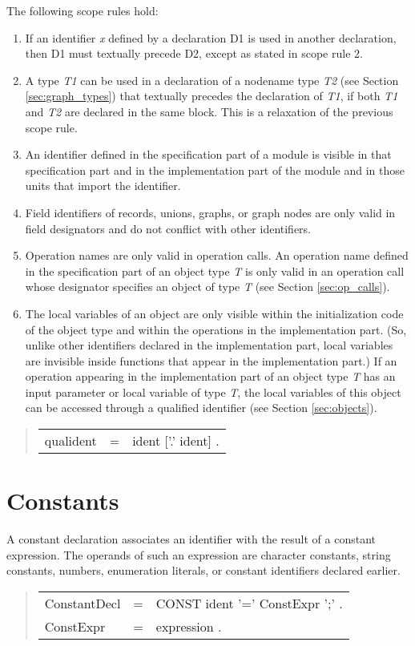 \documentclass[10pt]{article}
\newenvironment{grammar}
{\begin{quote} \begin{tabular}{p{3.8cm} l l}}
{\end{tabular}\end{quote}}
\begin{document}
The following scope rules hold:
\begin{enumerate}
\item
If an identifier {\em x} defined by a declaration D1 is used in another
declaration, then D1 must textually precede D2,
except as stated in scope rule 2.
\item
A type {\em T1} can be used in a declaration of
a nodename type {\em T2} (see Section \ref{sec:graph_types})
that textually precedes the declaration
of {\em T1}, if both {\em T1} and {\em T2} are declared in the same block.
This is a relaxation of the previous scope rule.
\item
An identifier defined in the specification part of a module is visible
in that specification part and in the implementation part of the module and
in those units that import the identifier.
\item
Field identifiers of records, unions, graphs, or graph nodes are only valid
in field designators and do not conflict with other identifiers.
\item
Operation names are only valid in operation calls.
An operation name defined in the specification part of an object type {\em T}
is only valid in an operation call whose designator specifies an object
of type {\em T} (see Section \ref{sec:op_calls}).
\item
The local variables of an object are only visible within the initialization
code of the object type and within the operations in the implementation
part.
(So, unlike other identifiers declared in the implementation part,
local variables are invisible inside functions that appear
in the implementation part.)
If an operation appearing in the implementation part
of an object type {\em T}  has an input parameter or
local variable of type {\em T},
the local variables of this object can be
accessed through a qualified identifier (see Section \ref{sec:objects}).
\end{enumerate}
\begin{grammar}
qualident & = & ident ['.' ident] .
\end{grammar}

\section{Constants}\label{sec:constants}

A constant declaration associates an identifier with the result of a
constant expression.
The operands of such an expression are
character constants, string constants,
numbers, enumeration literals,
or constant identifiers declared earlier.
\begin{grammar}
ConstantDecl & = & CONST ident '=' ConstExpr ';' . \\
ConstExpr & = & expression .
\end{grammar}
\end{document}
